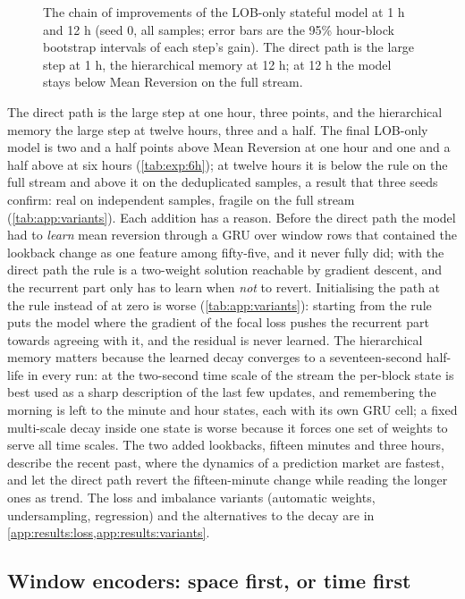 \begin{figure}[t]
\centering

\caption{The chain of improvements of the LOB-only stateful model at 1 h and 12 h (seed 0,
all samples; error bars are the 95\% hour-block bootstrap intervals of each step's gain).
The direct path is the large step at 1 h, the hierarchical memory at 12 h; at 12 h the
model stays below Mean Reversion on the full stream.}
\label{fig:stateful:chain}
\end{figure}

The direct path is the large step at one hour, three points, and the hierarchical memory
the large step at twelve hours, three and a half.  The final LOB-only model is two and a half
points above Mean Reversion at one hour and one and a half above at six hours
(\cref{tab:exp:6h}); at twelve hours it is below the rule on the full stream and above it on
the deduplicated samples, a result that three seeds confirm: real on independent samples,
fragile on the full stream (\cref{tab:app:variants}).  Each addition has a reason.  Before
the direct path the model had to \emph{learn} mean reversion through a GRU over window rows
that contained the lookback change as one feature among fifty-five, and it never fully did;
with the direct path the rule is a two-weight solution reachable by gradient descent, and
the recurrent part only has to learn when \emph{not} to revert.  Initialising the path at
the rule instead of at zero is worse (\cref{tab:app:variants}): starting from the rule puts
the model where the gradient of the focal loss pushes the recurrent part towards agreeing
with it, and the residual is never learned.  The hierarchical memory matters because the
learned decay converges to a seventeen-second half-life in every run: at the two-second
time scale of the stream the per-block state is best used as a sharp description of the
last few updates, and remembering the morning is left to the minute and hour states, each
with its own GRU cell; a fixed multi-scale decay inside one state is worse because it forces
one set of weights to serve all time scales.  The two added lookbacks, fifteen minutes and
three hours, describe the recent past, where the dynamics of a prediction market are
fastest, and let the direct path revert the fifteen-minute change while reading the longer
ones as trend.  The loss and imbalance variants (automatic weights, undersampling,
regression) and the alternatives to the decay are in \cref{app:results:loss,app:results:variants}.

\subsection{Window encoders: space first, or time first}
\label{sec:stateful:encoders}
\label{sec:analysis:encoders}

